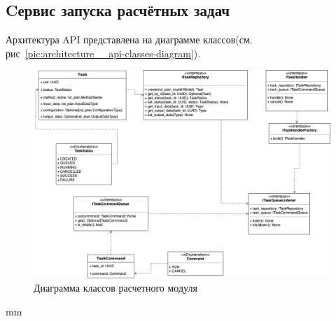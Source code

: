 \subsection{\large{Cервис запуска расчётных задач}}

Архитектура API представлена на диаграмме классов(см. рис\ \ref{pic:architecture__api-classes-diagram}).

\begin{figure}[H]
	\hspace*{-2.5 cm}\includegraphics[width=1.2\textwidth]{architecture/pictures/executor/execution_classes_diagram}
	\caption{Диаграмма классов расчетного модуля}
	\label{pic:architecture__execution-classes-diagram}
\end{figure}
 mm
